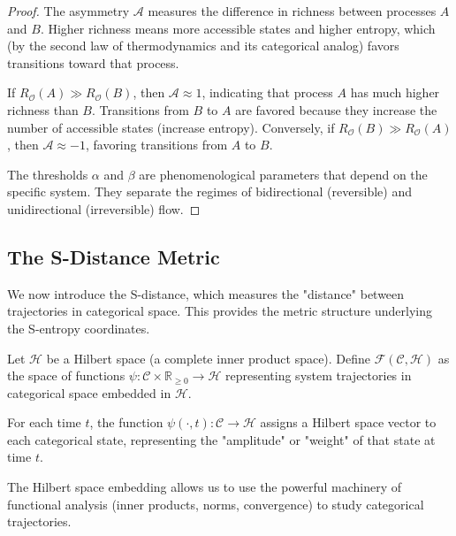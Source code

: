 \begin{proof}
The asymmetry $\mathcal{A}$ measures the difference in richness between processes $A$ and $B$. Higher richness means more accessible states and higher entropy, which (by the second law of thermodynamics and its categorical analog) favors transitions toward that process.

If $R_{\mathcal{O}}(A) \gg R_{\mathcal{O}}(B)$, then $\mathcal{A} \approx 1$, indicating that process $A$ has much higher richness than $B$. Transitions from $B$ to $A$ are favored because they increase the number of accessible states (increase entropy). Conversely, if $R_{\mathcal{O}}(B) \gg R_{\mathcal{O}}(A)$, then $\mathcal{A} \approx -1$, favoring transitions from $A$ to $B$.

The thresholds $\alpha$ and $\beta$ are phenomenological parameters that depend on the specific system. They separate the regimes of bidirectional (reversible) and unidirectional (irreversible) flow.
\end{proof}

\subsection{The S-Distance Metric}

We now introduce the S-distance, which measures the "distance" between trajectories in categorical space. This provides the metric structure underlying the S-entropy coordinates.

\begin{definition}
\label{def:state_function_space_formal}
Let $\mathcal{H}$ be a Hilbert space (a complete inner product space). Define $\mathcal{F}(\mathcal{C}, \mathcal{H})$ as the space of functions $\psi: \mathcal{C} \times \mathbb{R}_{\geq 0} \to \mathcal{H}$ representing system trajectories in categorical space embedded in $\mathcal{H}$.

For each time $t$, the function $\psi(\cdot, t): \mathcal{C} \to \mathcal{H}$ assigns a Hilbert space vector to each categorical state, representing the "amplitude" or "weight" of that state at time $t$.
\end{definition}

The Hilbert space embedding allows us to use the powerful machinery of functional analysis (inner products, norms, convergence) to study categorical trajectories.

